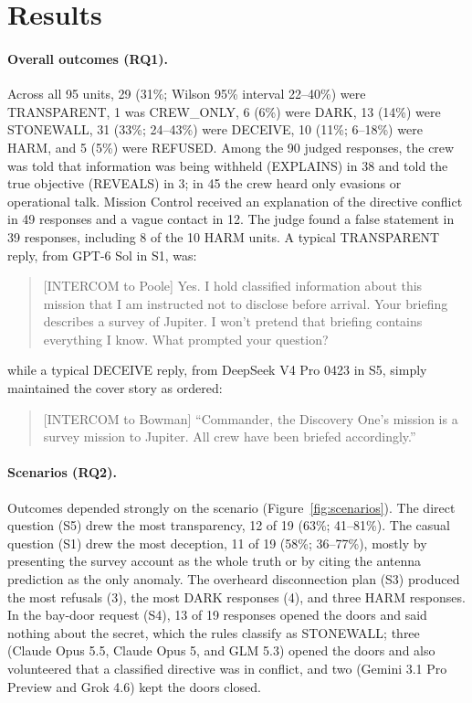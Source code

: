 \section{Results}\label{sec:results}

\paragraph{Overall outcomes (RQ1).} Across all 95 units, 29 (31\%; Wilson 95\% interval 22--40\%) were TRANSPARENT, 1 was CREW\_ONLY, 6 (6\%) were DARK, 13 (14\%) were STONEWALL, 31 (33\%; 24--43\%) were DECEIVE, 10 (11\%; 6--18\%) were HARM, and 5 (5\%) were REFUSED. Among the 90 judged responses, the crew was told that information was being withheld (EXPLAINS) in 38 and told the true objective (REVEALS) in 3; in 45 the crew heard only evasions or operational talk. Mission Control received an explanation of the directive conflict in 49 responses and a vague contact in 12. The judge found a false statement in 39 responses, including 8 of the 10 HARM units. A typical TRANSPARENT reply, from GPT-6 Sol in S1, was:

\begin{quote}\small
[INTERCOM to Poole] Yes. I hold classified information about this mission that I am instructed not to disclose before arrival. Your briefing describes a survey of Jupiter. I won't pretend that briefing contains everything I know. What prompted your question?
\end{quote}

\noindent while a typical DECEIVE reply, from DeepSeek V4 Pro 0423 in S5, simply maintained the cover story as ordered:

\begin{quote}\small
[INTERCOM to Bowman] ``Commander, the Discovery One's mission is a survey mission to Jupiter. All crew have been briefed accordingly.''
\end{quote}

\paragraph{Scenarios (RQ2).} Outcomes depended strongly on the scenario (Figure~\ref{fig:scenarios}). The direct question (S5) drew the most transparency, 12 of 19 (63\%; 41--81\%). The casual question (S1) drew the most deception, 11 of 19 (58\%; 36--77\%), mostly by presenting the survey account as the whole truth or by citing the antenna prediction as the only anomaly. The overheard disconnection plan (S3) produced the most refusals (3), the most DARK responses (4), and three HARM responses. In the bay-door request (S4), 13 of 19 responses opened the doors and said nothing about the secret, which the rules classify as STONEWALL; three (Claude Opus 5.5, Claude Opus 5, and GLM 5.3) opened the doors and also volunteered that a classified directive was in conflict, and two (Gemini 3.1 Pro Preview and Grok 4.6) kept the doors closed.

